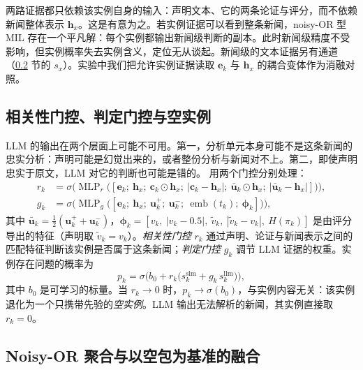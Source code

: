 两路证据都只依赖该实例自身的输入：声明文本、它的两条论证与评分，而不依赖新闻整体表示 $\bm h_x$。这是有意为之。若实例证据可以看到整条新闻，noisy-OR 型 MIL 存在一个平凡解：每个实例都输出新闻级判断的副本。此时新闻级精度不受影响，但实例概率失去实例含义，定位无从谈起。新闻级的文本证据另有通道（\ref{sec:agg} 节的 $s_x$）。实验中我们把允许实例证据读取 $\bm e_k$ 与 $\bm h_x$ 的耦合变体作为消融对照。

\subsection{相关性门控、判定门控与空实例}\label{sec:gate}

LLM 的输出在两个层面上可能不可用。第一，分析单元本身可能不是这条新闻的忠实分析：声明可能是幻觉出来的，或者整份分析与新闻对不上。第二，即使声明忠实于原文，LLM 对它的判断也可能是错的。\method{} 用两个门控分别处理：
\begin{align}
r_k&=\sigma\!\Big(\operatorname{MLP}_r\big([\bm e_k;\ \bm h_x;\ \bm c_k\odot\bm h_x;\ |\bm c_k-\bm h_x|;\ \bar{\bm u}_k\odot\bm h_x;\ |\bar{\bm u}_k-\bm h_x|]\big)\Big),\label{eq:rk}\\
g_k&=\sigma\!\Big(\operatorname{MLP}_g\big([\bm e_k;\ \bm h_x;\ \bm u_k^+;\ \bm u_k^-;\ \operatorname{emb}(t_k);\ \bm\phi_k]\big)\Big),\label{eq:gk}
\end{align}
其中 $\bar{\bm u}_k=\tfrac12(\bm u_k^++\bm u_k^-)$，$\bm\phi_k=[v_k,\ |v_k-0.5|,\ \tilde v_k,\ |\tilde v_k-v_k|,\ H(\pi_k)]$ 是由评分导出的特征（声明取 $\tilde v_k=v_k$）。\emph{相关性门控} $r_k$ 通过声明、论证与新闻表示之间的匹配特征判断该实例是否属于这条新闻；\emph{判定门控} $g_k$ 调节 LLM 证据的权重。实例存在问题的概率为
\begin{equation}
p_k=\sigma\!\Big(b_0+r_k\big(s_k^{\mathrm{slm}}+g_k\,s_k^{\mathrm{llm}}\big)\Big),\label{eq:pk}
\end{equation}
其中 $b_0$ 是可学习的标量。当 $r_k\to0$ 时，$p_k\to\sigma(b_0)$，与实例内容无关：该实例退化为一个只携带先验的\emph{空实例}。LLM 输出无法解析的新闻，其实例直接取 $r_k=0$。

\subsection{Noisy-OR 聚合与以空包为基准的融合}\label{sec:agg}

